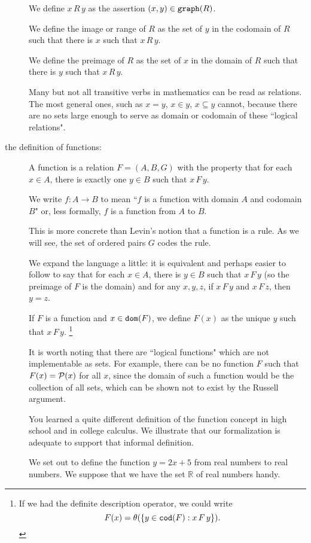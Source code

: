 \documentclass[12pt]{article}
\begin{document}
\begin{description}
We define $x \,R\, y$ as the assertion $(x,y) \in {\tt graph}(R)$.

We define the image or range of $R$ as the set of $y$ in the codomain of $R$ such that there is $x$ such that $x \, R \, y$.

We define the preimage of $R$ as the set of $x$ in the domain of $R$ such that there is $y$ such that $x \, R \, y$.

Many but not all transitive verbs in mathematics can be read as relations.  The most general ones, such
as $x = y$, $x \in y$, $x \subseteq y$ cannot, because there are no sets large enough to serve as domain or codomain of these ``logical relations".

\item[the definition of functions:]

A function is a relation $F = (A,B,G)$ with the property that for each $x \in A$, there is exactly one $y \in B$ such that $x \, F \, y$.

We write $f:A \rightarrow B$ to mean ``$f$ is a function with domain $A$ and codomain $B$" or, less formally, $f$ is a function from $A$ to $B$.

This is more concrete than Levin's notion that a function is a rule.  As we will see, the set of ordered pairs $G$ codes the rule.

We expand the language a little:  it is equivalent and perhaps easier to follow to say that for each $x \in A$, there is $y \in B$ such that $x \, F\, y$ (so the preimage of $F$ is the domain) and for any $x,y,z$, if $x \, F \, y$ and $x \, F\, z$, then $y=z$.

If $F$ is a function and $x \in {\tt dom}(F)$, we define $F(x)$ as the unique $y$ such that $x \, F \, y$.  \footnote{If we had the definite description operator, we could write $$F(x) = \theta(\{y\in {\tt cod}(F):x \, F \, y\}).$$}

It is worth noting that there are ``logical functions" which are not implementable as sets.  For example,
there can be no function $F$ such that $F(x) = {\cal P}(x)$ for all $x$, since the domain of such a function would be the collection of all sets, which can be shown not to exist by the Russell argument.

You learned a quite different definition of the function concept in high school and in college calculus.  We illustrate that our formalization is adequate to support that informal definition.

We set out to define the function $y=2x+5$ from real numbers to real numbers.  We suppose that we have the set
$\mathbb R$ of real numbers handy.


\end{description}
\end{document}
